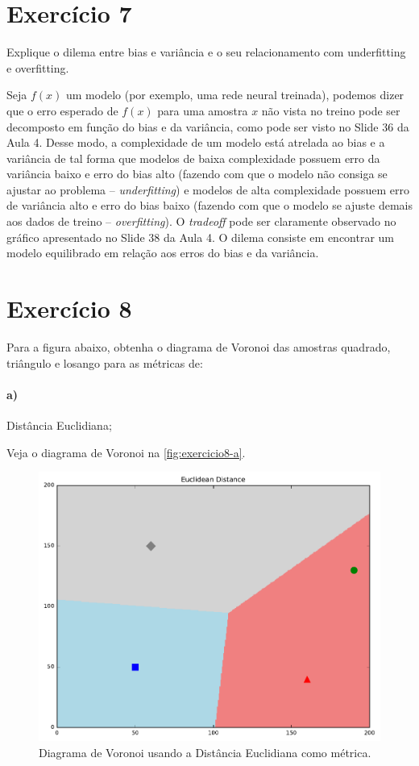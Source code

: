 \documentclass{article}
\begin{document}
\section{Exercício 7}

Explique o dilema entre bias e variância e o seu relacionamento com underfitting e
overfitting.

Seja $f(x)$ um modelo (por exemplo, uma rede neural treinada), podemos dizer que o erro esperado de $f(x)$ para uma amostra $x$ não vista no treino pode ser decomposto em função do bias e da variância, como pode ser visto no Slide 36 da Aula 4. Desse modo, a complexidade de um modelo está atrelada ao bias e a variância de tal forma que modelos de baixa complexidade possuem erro da variância baixo e erro do bias alto (fazendo com que o modelo não consiga se ajustar ao problema -- \textit{underfitting}) e modelos de alta complexidade possuem erro de variância alto e erro do bias baixo (fazendo com que o modelo se ajuste demais aos dados de treino -- \textit{overfitting}). O \textit{tradeoff} pode ser claramente observado no gráfico apresentado no Slide 38 da Aula 4. O dilema consiste em encontrar um modelo equilibrado em relação aos erros do bias e da variância.

\section{Exercício 8}

Para a figura abaixo, obtenha o diagrama de Voronoi das amostras quadrado, triângulo
e losango para as métricas de:

\paragraph{a)} Distância Euclidiana;

Veja o diagrama de Voronoi na \autoref{fig:exercicio8-a}.

\begin{figure}[h]
	\centering
	\includegraphics[width=0.5\linewidth]{exercicio8-a.pdf}
	\caption{Diagrama de Voronoi usando a Distância Euclidiana como métrica.}
	\label{fig:exercicio8-a}
\end{figure}
\end{document}
